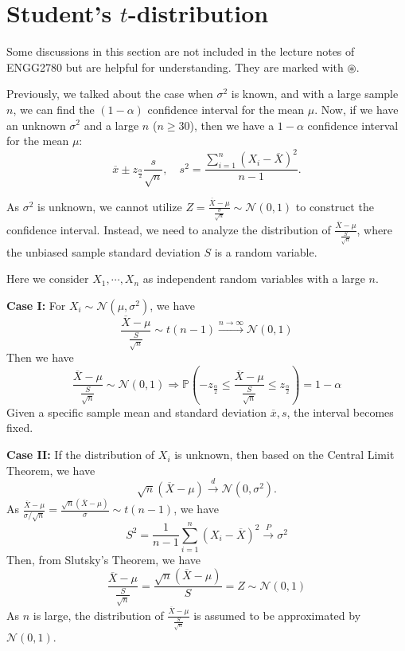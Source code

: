 \section{Student's \(t\)-distribution}

\begin{remark}
  Some discussions in this section are not included in the lecture notes of ENGG2780 but are helpful for understanding. They are marked with \(\circledast\). 
\end{remark}

Previously, we talked about the case when \(\sigma^2\) is known, and with a large sample \(n\), we can find the \((1 - \alpha)\) confidence interval for the mean \(\mu\). Now, if we have an unknown \(\sigma^2\) and a large \(n\) (\(n \geq 30\)), then we have a \(1 - \alpha\) confidence interval for the mean \(\mu\):  
\[
  \overline{x} \pm z_{\frac{\alpha}{2}} \dfrac{s}{\sqrt{n}}, \quad s^2 = \dfrac{\sum_{i = 1}^n (X_i - \overline{X})^2}{n - 1}.
\]

\begin{intuition}
  As \(\sigma^2\) is unknown, we cannot utilize \(Z = \frac{\overline{X} - \mu}{\frac{\sigma}{\sqrt{n}}} \sim \mathcal{N}(0, 1)\) to construct the confidence interval. Instead, we need to analyze the distribution of \(\frac{\overline{X} - \mu}{\frac{S}{\sqrt{n}}}\), where the unbiased sample standard deviation \(S\) is a random variable. 
  
  Here we consider \(X_1, \cdots, X_n\) as independent random variables with a large \(n\). 
  
  \textbf{Case I:} For \(X_i \sim \mathcal{N}(\mu, \sigma^2)\), we have 
  \[
    \frac{\overline{X} - \mu}{\frac{S}{\sqrt{n}}} \sim t(n - 1) \overset{n \to \infty}{\longrightarrow} \mathcal{N}(0, 1)
  \] 
  Then we have 
  \[
    \frac{\overline{X} - \mu}{\frac{S}{\sqrt{n}}} \sim \mathcal{N}(0, 1) \Rightarrow \mathbb{P}\left(-z_{\frac{\alpha}{2}} \leq \frac{\overline{X} - \mu}{\frac{S}{\sqrt{n}}} \leq z_{\frac{\alpha}{2}}\right) = 1 - \alpha
  \] 
  Given a specific sample mean and standard deviation \(\overline{x}, s\), the interval becomes fixed. 
  
  \textbf{Case II:} 
  If the distribution of \(X_i\) is unknown, then based on the Central Limit Theorem, we have 
  \[
    \sqrt{n}(\overline{X} - \mu) \xrightarrow{d} \mathcal{N}(0, \sigma^2). 
  \]
  As \(\frac{\overline{X} - \mu}{\sigma / \sqrt{n}} = \frac{\sqrt{n}(\overline{X} - \mu)}{\sigma} \sim t(n - 1)\), we have 
  \[
    S^2 = \frac{1}{n-1} \sum_{i=1}^{n} (X_i - \overline{X})^2 \overset{P}{\longrightarrow} \sigma^2
  \] 
  Then, from Slutsky's Theorem, we have 
  \[
    \frac{\overline{X} - \mu}{\frac{S}{\sqrt{n}}} = \frac{\sqrt{n}(\overline{X} - \mu)}{S} = Z \sim \mathcal{N}(0, 1)
  \] 
  As \(n\) is large, the distribution of \(\frac{\overline{X} - \mu}{\frac{S}{\sqrt{n}}}\) is assumed to be approximated by \(\mathcal{N}(0, 1)\).
\end{intuition}

